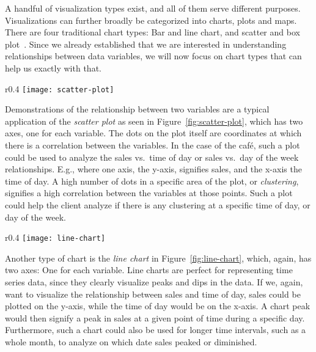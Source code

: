 A handful of visualization types exist, and all of them serve different purposes.
Visualizations can further broadly be categorized into charts, plots and maps.
There are four traditional chart types: Bar and line chart, and scatter and box plot~\cite{atlassianChartTypes}.
Since we already established that we are interested in understanding relationships between data variables, we will now
focus on chart types that can help us exactly with that.

\begin{wrapfigure}{r}{0.4\textwidth}
    \centering
    \texttt{[image: scatter-plot]}
    \caption{A typical scatter plot~\cite{atlassianChartTypes}.
    }\label{fig:scatter-plot}
\end{wrapfigure}

Demonstrations of the relationship between two variables are a typical application of the \textit{scatter plot}
as seen in Figure~\ref{fig:scatter-plot}, which has two axes, one for each variable.
The dots on the plot itself are coordinates at which there is a correlation between the variables.
In the case of the café, such a plot could be used to analyze the sales vs.\ time of day or sales vs.\ day of the week
relationships.
E.g., where one axis, the y-axis, signifies sales, and the x-axis the time of day.
A high number of dots in a specific area of the plot, or \textit{clustering}, signifies a high correlation between the
variables at those points.
Such a plot could help the client analyze if there is any clustering at a specific time of day, or day of the week.

\begin{wrapfigure}{r}{0.4\textwidth}
    \centering
    \texttt{[image: line-chart]}
    \caption{A line chart~\cite{atlassianChartTypes}.
    }\label{fig:line-chart}
\end{wrapfigure}

Another type of chart is the \textit{line chart} in Figure~\ref{fig:line-chart}, which, again, has two axes: One for
each variable.
Line charts are perfect for representing time series data, since they clearly visualize peaks and dips in the data.
If we, again, want to visualize the relationship between sales and time of day, sales could be plotted on the y-axis,
while the time of day would be on the x-axis.
A chart peak would then signify a peak in sales at a given point of time during a specific day.
Furthermore, such a chart could also be used for longer time intervals, such as a whole month, to analyze on which date
sales peaked or diminished.

